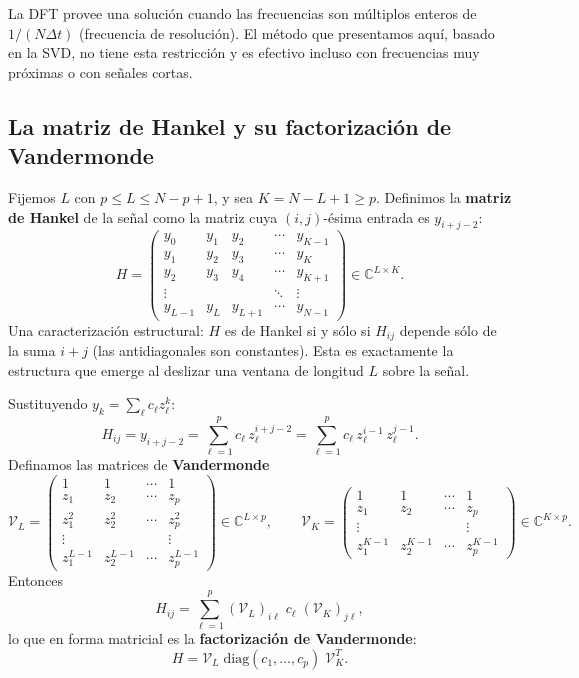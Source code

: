 \documentclass[12pt]{article}
\newcommand{\C}{\mathbb{C}}
\begin{document}
La DFT provee una solución cuando las frecuencias son múltiplos enteros de $1/(N\Delta t)$ (frecuencia de resolución). El método que presentamos aquí, basado en la SVD, no tiene esta restricción y es efectivo incluso con frecuencias muy próximas o con señales cortas.

\subsection{La matriz de Hankel y su factorización de Vandermonde}

Fijemos $L$ con $p \leq L \leq N - p + 1$, y sea $K = N - L + 1 \geq p$. Definimos la \textbf{matriz de Hankel} de la señal como la matriz cuya $(i,j)$-ésima entrada es $y_{i+j-2}$:
\[
  H = \begin{pmatrix}
    y_0     & y_1     & y_2     & \cdots & y_{K-1}  \\
    y_1     & y_2     & y_3     & \cdots & y_{K}    \\
    y_2     & y_3     & y_4     & \cdots & y_{K+1}  \\
    \vdots  &         &         & \ddots & \vdots   \\
    y_{L-1} & y_L     & y_{L+1} & \cdots & y_{N-1}
  \end{pmatrix} \in \C^{L \times K}.
\]
Una caracterización estructural: $H$ es de Hankel si y sólo si $H_{ij}$ depende sólo de la suma $i+j$ (las antidiagonales son constantes). Esta es exactamente la estructura que emerge al deslizar una ventana de longitud $L$ sobre la señal.

Sustituyendo $y_k = \sum_\ell c_\ell z_\ell^k$:
\[
  H_{ij} = y_{i+j-2} = \sum_{\ell=1}^p c_\ell\, z_\ell^{i+j-2} = \sum_{\ell=1}^p c_\ell\, z_\ell^{i-1}\, z_\ell^{j-1}.
\]
Definamos las matrices de \textbf{Vandermonde}
\[
  \mathcal{V}_L = \begin{pmatrix}
    1 & 1 & \cdots & 1 \\
    z_1 & z_2 & \cdots & z_p \\
    z_1^2 & z_2^2 & \cdots & z_p^2 \\
    \vdots & & & \vdots \\
    z_1^{L-1} & z_2^{L-1} & \cdots & z_p^{L-1}
  \end{pmatrix} \in \C^{L \times p}, \qquad
  \mathcal{V}_K = \begin{pmatrix}
    1 & 1 & \cdots & 1 \\
    z_1 & z_2 & \cdots & z_p \\
    \vdots & & & \vdots \\
    z_1^{K-1} & z_2^{K-1} & \cdots & z_p^{K-1}
  \end{pmatrix} \in \C^{K \times p}.
\]
Entonces
\[
  H_{ij} = \sum_{\ell=1}^p (\mathcal{V}_L)_{i\ell}\; c_\ell\; (\mathcal{V}_K)_{j\ell},
\]
lo que en forma matricial es la \textbf{factorización de Vandermonde}:
\[
  \boxed{H = \mathcal{V}_L\; \mathrm{diag}(c_1, \ldots, c_p)\; \mathcal{V}_K^T.}
\]
\end{document}
